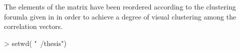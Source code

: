 The elements of the matrix have been reordered according to the
clustering forumla given in \citet[sec. 6.2.3]{Sarkar2008} in order to
achieve a degree of visual clustering among the correlation vectors.

\begin{Schunk}
\begin{Sinput}
> setwd( "~/thesis")
\end{Sinput}
\end{Schunk}

